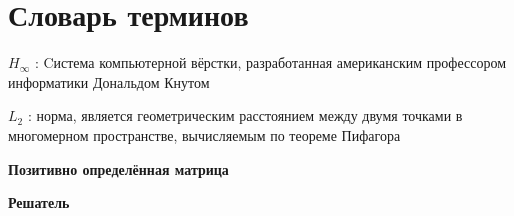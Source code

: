 \chapter*{Словарь терминов}             %

\textbf{\(H_\infty\)} : Cистема компьютерной вёрстки, разработанная американским профессором информатики Дональдом Кнутом

\textbf{\(L_2\)} : норма, является геометрическим расстоянием между двумя точками в многомерном пространстве, вычисляемым по теореме Пифагора

\textbf{Позитивно определённая матрица}

\textbf{Решатель}